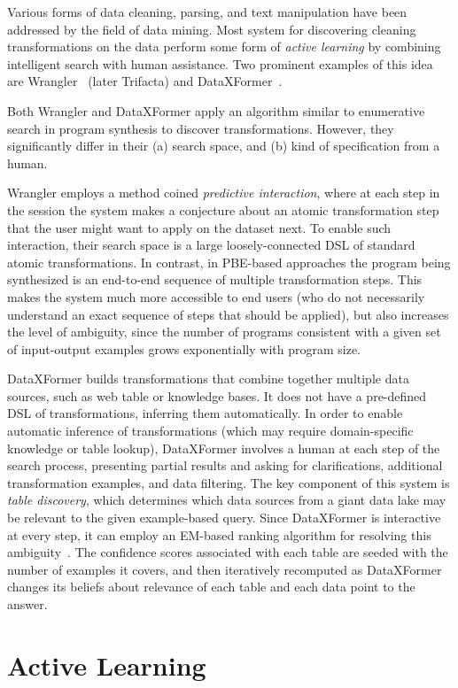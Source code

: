 Various forms of data cleaning, parsing, and text manipulation have been addressed by the field of data mining.
Most system for discovering cleaning transformations on the data perform some form of \emph{active learning} by
combining intelligent search with human assistance.
Two prominent examples of this idea are Wrangler~\cite{wrangler} (later Trifacta) and DataXFormer~\cite{dataxformer}.

Both Wrangler and DataXFormer apply an algorithm similar to enumerative search in program synthesis to discover
transformations.
However, they significantly differ in their (a) search space, and (b) kind of specification from a human.

Wrangler employs a method coined \emph{predictive interaction}, where at each step in the session the system makes a
conjecture about an atomic transformation step that the user might want to apply on the dataset next.
To enable such interaction, their search space is a large loosely-connected DSL of standard atomic transformations.
In contrast, in PBE-based approaches the program being synthesized is an end-to-end sequence of multiple transformation
steps.
This makes the system much more accessible to end users (who do not necessarily understand an exact sequence of steps
that should be applied), but also increases the level of ambiguity, since the number of programs consistent with a given
set of input-output examples grows exponentially with program size.

DataXFormer builds transformations that combine together multiple data sources, such as web table or knowledge bases.
It does not have a pre-defined DSL of transformations, inferring them automatically.
In order to enable automatic inference of transformations (which may require domain-specific knowledge or table lookup),
DataXFormer involves a human at each step of the search process, presenting partial results and asking for
clarifications, additional transformation examples, and data filtering.
The key component of this system is \emph{table discovery}, which determines which data sources from a giant data lake
may be relevant to the given example-based query.
Since DataXFormer is interactive at every step, it can employ an EM-based ranking algorithm for resolving this
ambiguity~\cite{dataxformer}.
The confidence scores associated with each table are seeded with the number of examples it covers, and then iteratively
recomputed as DataXFormer changes its beliefs about relevance of each table and each data point to the answer.

\section{Active Learning}
